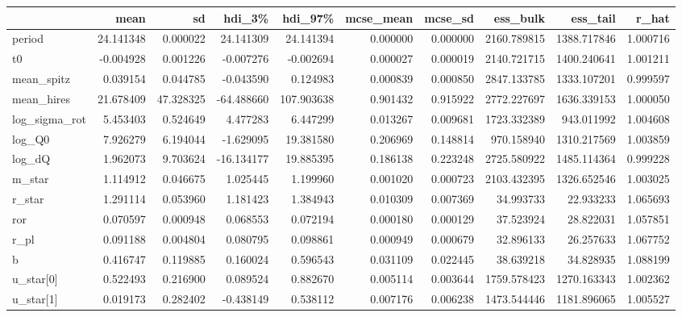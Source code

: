 \begin{tabular}{lrrrrrrrrr}
\toprule
{} &       mean &         sd &     hdi\_3\% &     hdi\_97\% &  mcse\_mean &   mcse\_sd &     ess\_bulk &     ess\_tail &     r\_hat \\
\midrule
period        &  24.141348 &   0.000022 &  24.141309 &   24.141394 &   0.000000 &  0.000000 &  2160.789815 &  1388.717846 &  1.000716 \\
t0            &  -0.004928 &   0.001226 &  -0.007276 &   -0.002694 &   0.000027 &  0.000019 &  2140.721715 &  1400.240641 &  1.001211 \\
mean\_spitz    &   0.039154 &   0.044785 &  -0.043590 &    0.124983 &   0.000839 &  0.000850 &  2847.133785 &  1333.107201 &  0.999597 \\
mean\_hires    &  21.678409 &  47.328325 & -64.488660 &  107.903638 &   0.901432 &  0.915922 &  2772.227697 &  1636.339153 &  1.000050 \\
log\_sigma\_rot &   5.453403 &   0.524649 &   4.477283 &    6.447299 &   0.013267 &  0.009681 &  1723.332389 &   943.011992 &  1.004608 \\
log\_Q0        &   7.926279 &   6.194044 &  -1.629095 &   19.381580 &   0.206969 &  0.148814 &   970.158940 &  1310.217569 &  1.003859 \\
log\_dQ        &   1.962073 &   9.703624 & -16.134177 &   19.885395 &   0.186138 &  0.223248 &  2725.580922 &  1485.114364 &  0.999228 \\
m\_star        &   1.114912 &   0.046675 &   1.025445 &    1.199960 &   0.001020 &  0.000723 &  2103.432395 &  1326.652546 &  1.003025 \\
r\_star        &   1.291114 &   0.053960 &   1.181423 &    1.384943 &   0.010309 &  0.007369 &    34.993733 &    22.933233 &  1.065693 \\
ror           &   0.070597 &   0.000948 &   0.068553 &    0.072194 &   0.000180 &  0.000129 &    37.523924 &    28.822031 &  1.057851 \\
r\_pl          &   0.091188 &   0.004804 &   0.080795 &    0.098861 &   0.000949 &  0.000679 &    32.896133 &    26.257633 &  1.067752 \\
b             &   0.416747 &   0.119885 &   0.160024 &    0.596543 &   0.031109 &  0.022445 &    38.639218 &    34.828935 &  1.088199 \\
u\_star[0]     &   0.522493 &   0.216900 &   0.089524 &    0.882670 &   0.005114 &  0.003644 &  1759.578423 &  1270.163343 &  1.002362 \\
u\_star[1]     &   0.019173 &   0.282402 &  -0.438149 &    0.538112 &   0.007176 &  0.006238 &  1473.544446 &  1181.896065 &  1.005527 \\

\end{tabular}
